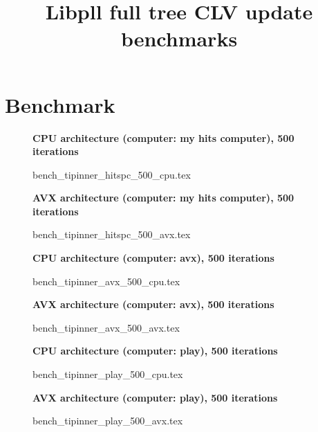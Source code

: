 \documentclass[a4paper]{article}
\begin{document}
\newcommand*{\figuretitle}[1]{%
    {\centering%
    \textbf{#1}%
    \par\medskip}%
}


\title{Libpll full tree CLV update benchmarks}
\maketitle



\section{Benchmark}


\begin{figure}[!htb]
\figuretitle{CPU architecture (computer: my hits computer), 500 iterations}
{bench_tipinner_hitspc_500_cpu.tex}
\end{figure}

\begin{figure}[!htb]
\figuretitle{AVX architecture (computer: my hits computer), 500 iterations}
{bench_tipinner_hitspc_500_avx.tex}
\end{figure}

\begin{figure}[!htb]
\figuretitle{CPU architecture (computer: avx), 500 iterations}
{bench_tipinner_avx_500_cpu.tex}
\end{figure}

\begin{figure}[!htb]
\figuretitle{AVX architecture (computer: avx), 500 iterations}
{bench_tipinner_avx_500_avx.tex}
\end{figure}

\begin{figure}[!htb]
\figuretitle{CPU architecture (computer: play), 500 iterations}
{bench_tipinner_play_500_cpu.tex}
\end{figure}

\begin{figure}[!htb]
\figuretitle{AVX architecture (computer: play), 500 iterations}
{bench_tipinner_play_500_avx.tex}
\end{figure}
\end{document}
